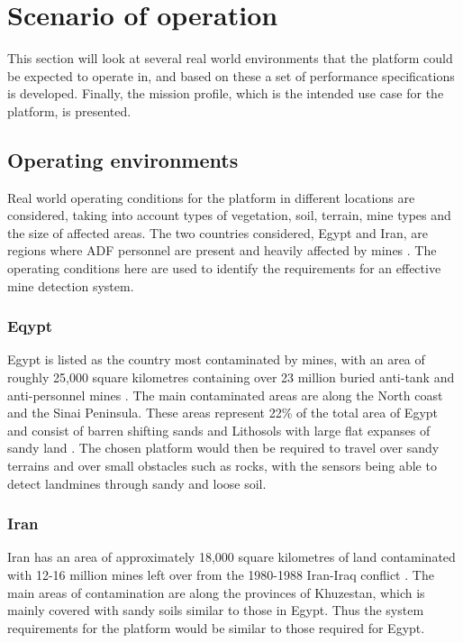 \documentclass[main.tex]{subfiles}
\begin{document}
\section{Scenario of operation}
This section will look at several real world environments that the platform could be expected to operate in, and based on these a set of performance specifications is developed. Finally, the mission profile, which is the intended use case for the platform, is presented.  

\subsection{Operating environments}

Real world operating conditions for the platform in different locations are considered, taking into account types of vegetation, soil, terrain, mine types and the size of affected areas. The two countries considered, Egypt and Iran, are regions where ADF personnel are present and heavily affected by mines \parencite{AustralianGovernment2016}. The operating conditions here are used to identify the requirements for an effective mine detection system.

\subsubsection{Eqypt}
Egypt is listed as the country most contaminated by mines, with an area of roughly 25,000 square kilometres containing over 23 million buried anti-tank and anti-personnel mines \parencite{Rushfan2008}. The main contaminated areas are along the North coast and the Sinai Peninsula. These areas represent 22\% of the total area of Egypt and consist of barren shifting sands and Lithosols with large flat expanses of sandy land \parencite{Nahrawy2011}. The chosen platform would then be required to travel over sandy terrains and over small obstacles such as rocks, with the sensors being able to detect landmines through sandy and loose soil. 
 \subsubsection{Iran}
Iran has an area of approximately 18,000 square kilometres of land contaminated with 12-16 million mines left over from the 1980-1988 Iran-Iraq conflict \parencite{landmineMonitor2015}. The main areas of contamination are along the provinces of Khuzestan, which is mainly covered with sandy soils similar to those in Egypt. Thus the system requirements for the platform would be similar to those required for Egypt.
\end{document}

